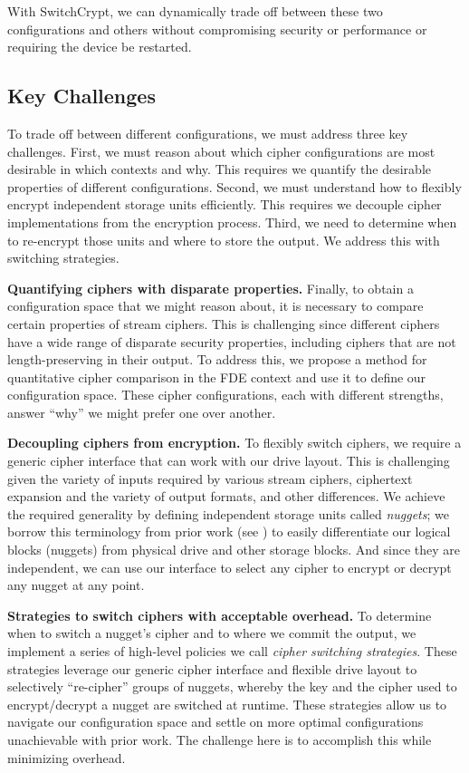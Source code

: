 With SwitchCrypt, we can dynamically trade off between these two configurations
and others without compromising security or performance or requiring the device
be restarted.

\subsection{Key Challenges}

To trade off between different configurations, we must address three key
challenges. First, we must reason about which cipher configurations are most
desirable in which contexts and why. This requires we quantify the desirable
properties of different configurations. Second, we must understand how to
flexibly encrypt independent storage units efficiently. This requires we
decouple cipher implementations from the encryption process. Third, we need to
determine when to re-encrypt those units and where to store the output. We
address this with switching strategies.

\textbf{Quantifying ciphers with disparate properties.} Finally, to obtain a
configuration space that we might reason about, it is necessary to compare
certain properties of stream ciphers. This is challenging since different
ciphers have a wide range of disparate security properties, including ciphers
that are not length-preserving in their output. To address this, we propose a
method for quantitative cipher comparison in the FDE context and use it to
define our configuration space. These cipher configurations, each with different
strengths, answer ``why'' we might prefer one over another.

\textbf{Decoupling ciphers from encryption.} To flexibly switch ciphers, we
require a generic cipher interface that can work with our drive layout. This is
challenging given the variety of inputs required by various stream ciphers,
ciphertext expansion and the variety of output formats, and other differences.
We achieve the required generality by defining independent storage units called
\emph{nuggets}; we borrow this terminology from prior work (see
\cite{StrongBox}) to easily differentiate our logical blocks (nuggets) from
physical drive and other storage blocks. And since they are independent, we can
use our interface to select any cipher to encrypt or decrypt any nugget at any
point.

\textbf{Strategies to switch ciphers with acceptable overhead.} To determine
when to switch a nugget's cipher and to where we commit the output, we implement
a series of high-level policies we call \textit{cipher switching strategies}.
These strategies leverage our generic cipher interface and flexible drive layout
to selectively ``re-cipher'' groups of nuggets, whereby the key and the cipher
used to encrypt/decrypt a nugget are switched at runtime. These strategies allow
us to navigate our configuration space and settle on more optimal configurations
unachievable with prior work. The challenge here is to accomplish this while
minimizing overhead.
